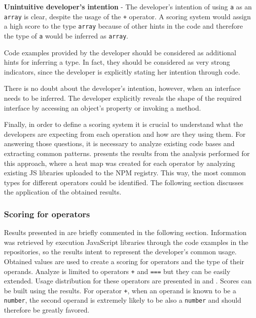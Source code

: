 \begin{code}
  \captionsetup{aboveskip=0pt, belowskip=10pt}
  \caption[Unintuitive developer's intention]{\textbf{Unintuitive developer's intention} - The developer's intention of using \texttt{a} as an \texttt{array} is clear, despite the usage of the \texttt{+} operator. A scoring system would assign a high score to the type \texttt{array} because of other hints in the code and therefore the type of \texttt{a} would be inferred as \texttt{array}.}
  \label{code:type-inference-unintuitive-developers-intention}
\end{code}

Code examples provided by the developer should be considered as additional hints for inferring a type. In fact, they should be considered as very strong indicators, since the developer is explicitly stating her intention through code.

There is no doubt about the developer's intention, however, when an interface needs to be inferred. The developer explicitly reveals the shape of the required interface by accessing an object's property or invoking a method.

Finally, in order to define a scoring system it is crucial to understand what the developers are expecting from each operation and how are they using them. For answering those questions, it is necessary to analyze existing code bases and extracting common patterns.  presents the results from the analysis performed for this approach, where a heat map was created for each operator by analyzing existing JS libraries uploaded to the NPM registry. This way, the most common types for different operators could be identified. The following section discusses the application of the obtained results.

\subsubsection{Scoring for operators}
Results presented in  are briefly commented in the following section. Information was retrieved by execution JavaScript libraries through the code examples in the repositories, so the results intent to represent the developer's common usage. Obtained values are used to create a scoring for operators and the type of their operands. Analyze is limited to operators \texttt{+} and \texttt{===} but they can be easily extended. Usage distribution for these operators are presented in  and . Scores can be built using the results. For operator \texttt{+}, when an operand is known to be a \texttt{number}, the second operand is extremely likely to be also a \texttt{number} and should therefore be greatly favored.




